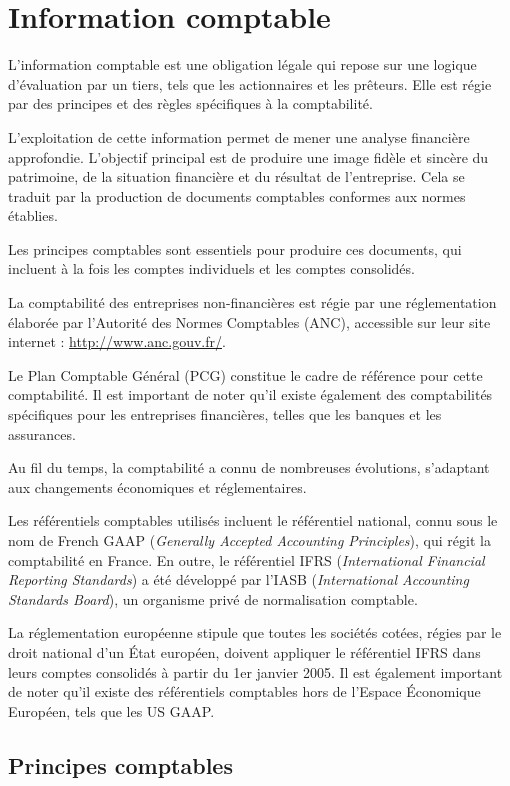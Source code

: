 \documentclass[a4paper, 12pt]{report}
\begin{document}
\section{Information comptable}

L'information comptable est une obligation légale qui repose sur une logique d'évaluation par un tiers, tels que les actionnaires et les prêteurs. Elle est régie par des principes et des règles spécifiques à la comptabilité.

L'exploitation de cette information permet de mener une analyse financière approfondie. L'objectif principal est de produire une image fidèle et sincère du patrimoine, de la situation financière et du résultat de l'entreprise. Cela se traduit par la production de documents comptables conformes aux normes établies.

Les principes comptables sont essentiels pour produire ces documents, qui incluent à la fois les comptes individuels et les comptes consolidés.

La comptabilité des entreprises non-financières est régie par une réglementation élaborée par l'Autorité des Normes Comptables (ANC), accessible sur leur site internet : \url{http://www.anc.gouv.fr/}. 

Le Plan Comptable Général (PCG) constitue le cadre de référence pour cette comptabilité. Il est important de noter qu'il existe également des comptabilités spécifiques pour les entreprises financières, telles que les banques et les assurances.

Au fil du temps, la comptabilité a connu de nombreuses évolutions, s'adaptant aux changements économiques et réglementaires.

Les référentiels comptables utilisés incluent le référentiel national, connu sous le nom de French GAAP (\textit{Generally Accepted Accounting Principles}), qui régit la comptabilité en France. En outre, le référentiel IFRS (\textit{International Financial Reporting Standards}) a été développé par l'IASB (\textit{International Accounting Standards Board}), un organisme privé de normalisation comptable.

La réglementation européenne stipule que toutes les sociétés cotées, régies par le droit national d'un État européen, doivent appliquer le référentiel IFRS dans leurs comptes consolidés à partir du 1er janvier 2005. Il est également important de noter qu'il existe des référentiels comptables hors de l'Espace Économique Européen, tels que les US GAAP.

\subsection{Principes comptables}
\end{document}
